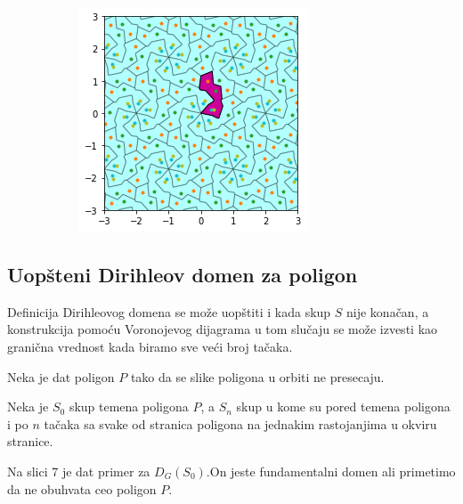 \documentclass[11pt]{article}
\begin{document}
\begin{samepage}
\begin{figure}[H]
\begin{subfigure}[b]{0.3\textwidth}
    \label{fig:f5}
  \end{subfigure}
  \begin{subfigure}[b]{0.3\textwidth}
    \includegraphics[width=\textwidth]{output_16_0.png}
    \label{fig:f6}
  \end{subfigure}
\end{figure}
\end{samepage}

    \subsection{Uop\v steni Dirihleov domen za poligon}\label{modifikacija-fundamentalne-oblasti-na-osnovu-podfundamentalne}
Definicija Dirihleovog domena se mo\v ze uop\v stiti i kada skup $S$ nije kona\v can, a konstrukcija pomo\' cu Voronojevog dijagrama u tom slu\v caju se mo\v ze izvesti kao grani\v cna vrednost kada biramo sve ve\'ci broj ta\v caka.

Neka je dat poligon $P$ tako da se slike poligona u orbiti ne presecaju. 

Neka je $S_0$ skup temena poligona $P$, a $S_n$ skup u kome su pored temena poligona i po $n$ ta\v caka sa svake od stranica poligona na jednakim rastojanjima u okviru stranice.

Na slici 7 je dat primer za $D_G(S_0)$.On jeste fundamentalni domen ali primetimo da ne obuhvata ceo poligon $P$.
\end{document}
